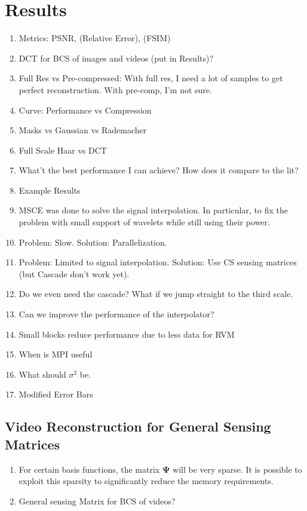 \chapter{Results}
\label{ch:results}
\begin{enumerate}
\item Metrics: PSNR, (Relative Error), (FSIM)
\item DCT for BCS of images and videos (put in Results)?
\item Full Res vs Pre-compressed: With full res, I need a lot of samples to get perfect reconstruction. With pre-comp, I'm not sure.
\item Curve: Performance vs Compression
\item Masks vs Gaussian vs Rademacher
\item Full Scale Haar vs DCT
\item What't the best performance I can achieve? How does it compare to the lit?
\item Example Results
\item MSCE was done to solve the signal interpolation. In particular, to fix the problem with small support of wavelets while still using their power.
\item Problem: Slow. Solution: Parallelization.
\item Problem: Limited to signal interpolation. Solution: Use CS sensing matrices (but Cascade don't work yet).
\item Do we even need the cascade? What if we jump straight to the third scale.
\item Can we improve the performance of the interpolator? 
\item Small blocks reduce performance due to less data for RVM
\item When is MPI useful
\item What should $\sigma^2$ be.
\item Modified Error Bars
\end{enumerate}

\section{Video Reconstruction for General Sensing Matrices}
\begin{enumerate}
\item For certain basis functions, the matrix $\bm\Psi$ will be very sparse. It is possible to exploit this sparsity to significantly reduce the memory requirements. 
\item General sensing Matrix for BCS of videos?
\end{enumerate}
